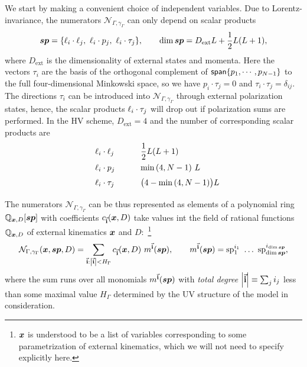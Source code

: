 We start by making a convenient choice of independent variables.
Due to Lorentz-invariance, the numerators $\mathcal{N}_{\Gamma,\gamma_\Gamma}$ can only depend on scalar products
\begin{equation}
  \label{eq:sps_all}
  \vb*{sp} = \{ \sp(\ell_i,\ell_j),~\sp(\ell_i,p_j),~\sp(\ell_i, \tau_j) \}, \qquad \dim{\vb*{sp}} = D_{\text{ext}} L + \frac{1}{2}L(L+1),
\end{equation}
where $D_{\text{ext}}$ is the dimensionality of external states and momenta.
Here the vectors $\tau_i$ are the basis of the orthogonal complement of $\mathsf{span}\{p_1,\cdots,p_{N-1}\}$ to the full four-dimensional Minkowski space,
so we have $p_i \cdot \tau_j = 0$ and $\tau_i \cdot \tau_j = \delta_{ij}$.
The directions $\tau_i$ can be introduced into $\mathcal{N}_{\Gamma,\gamma_\Gamma}$ through external polarization states, hence,
the scalar products $\sp(\ell_i, \tau_j)$ will drop out if polarization sums are performed.
In the HV scheme, $D_{\text{ext}}=4$ and the number of corresponding scalar products are
\begin{equation}
  \label{eq:sp_counts}
  \renewcommand{\arraystretch}{1.5}
  \begin{tabular}[h]{p{10ex} p{20ex}}
       $\sp(\ell_i,\ell_j)$  &   $\dfrac{1}{2}L(L+1)$                \\
        $\sp(\ell_i,p_j)$    &   $\min\qty(4,N-1) ~L$                  \\
       $\sp(\ell_i, \tau_j)$ &   $ \qty\big(4-\min\qty(4,N-1)) L $  \\
  \end{tabular}
\end{equation}

The numerators $\mathcal{N}_{\Gamma,\gamma_\Gamma}$ can be thus represented as elements of a polynomial ring
$\mathbb{Q}_{\vb*{x},D}[\vb*{sp}]$ 
with coefficients $c_{\va{i}}(\vb*{x},D)$ take values int the field of rational functions $\mathbb{Q}_{\vb*{x},D}$ of external kinematics $\vb*{x}$
and $D$:~\footnote{
  $\vb*{x}$ is understood to be a list of variables corresponding to some parametrization of external kinematics, which we will not need to specify explicitly here.
}
\begin{equation}
  \mathcal{N}_{\Gamma,\gamma_\Gamma}(\vb*{x}, \vb*{sp}, D) = \sum_{\va{i} : \abs{\va{i}} < H_{\Gamma}} c_{\va{i}} (\vb*{x},D)~ m^{\va{i}}(\vb*{sp}),
  \qquad m^{\va{i}}(\vb*{sp}) = \mathrm{sp}_1^{i_1} ~\ldots{}~ \mathrm{sp}_{\dim{\vb*{sp}}}^{i_{\dim{\vb*{sp}}}},
\end{equation}
where the sum runs over all monomials $m^{\va{i}}(\vb*{sp})$ with \emph{total degree} $\abs{\va{i}} \equiv \sum_j i_j$ less than
some maximal value $ H_{\Gamma} $ determined by the UV structure of the model in consideration.


